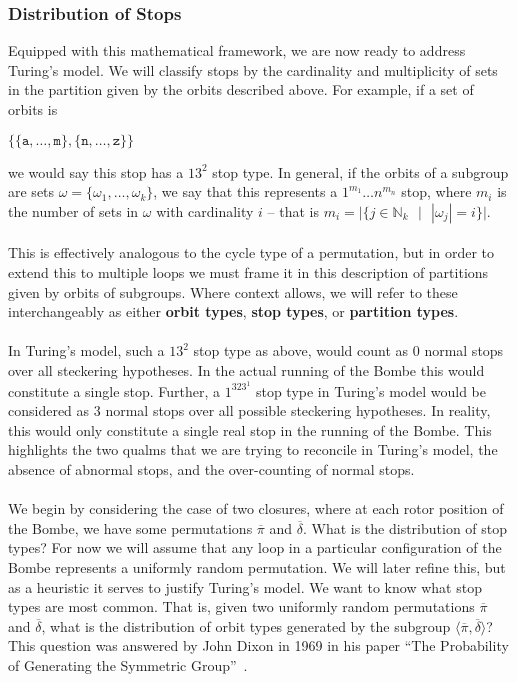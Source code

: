 \subsubsection{Distribution of Stops}
Equipped with this mathematical framework, we are now ready to address
Turing's model. We will classify stops by the cardinality and
multiplicity of sets in the partition given by the orbits described
above. For example, if a set of orbits is
\begin{center}
  $\{\{\texttt{a}, \dots, \texttt{m}\}, \{\texttt{n}, \dots, \texttt{z}\}\}$
\end{center}
we would say this stop has a $13^2$ stop type. In general, if the
orbits of a subgroup are sets $\omega = \{\omega_1,\dots,\omega_k\}$,
we say that this represents a $1^{m_1}\dots n^{m_n}$ stop, where
${m_i}$ is the number of sets in $\omega$ with cardinality $i$ --
that is $m_i =|\{j\in\mathbb{N}_k\text{ }|\text{ }|\omega_j| = i\}|$.
\\\\This is effectively
analogous to the cycle type of a permutation, but in order to extend
this to multiple loops we must frame it in this description of
partitions given by orbits of subgroups. Where context allows, we
will refer to these interchangeably as  either {\bf{orbit types}},
{\bf{stop types}}, or {\bf{partition types}}.
\\\\In Turing's model, such a $13^2$ stop type as above, would count as
$0$ normal stops over all steckering hypotheses. In the actual
running of the Bombe this would constitute a single stop. Further, a
$1^323^1$ stop type in Turing's model would be considered as $3$ normal
stops over all possible steckering hypotheses. In reality, this would
only constitute a single real stop in the running of the Bombe. This
highlights the two qualms that we are trying to reconcile in Turing's
model, the absence of abnormal stops, and the over-counting of normal stops.
\\\\We begin by considering the case of two closures, where at each
rotor position of the Bombe, we have some permutations $\overline\pi$
and $\overline\delta$. What is the distribution of stop types? For
now we will assume that any loop in a particular configuration of the
Bombe represents a uniformly random permutation. We will later refine this, but
as a heuristic it serves to justify Turing's model. We want to know
what stop types are most common. That is, given two uniformly random
permutations $\overline\pi$ and $\overline\delta$, what is the
distribution of orbit types generated by the subgroup
$\langle\overline\pi, \overline\delta\rangle$? This question was
answered by John Dixon in 1969 in his paper ``The Probability of
Generating the Symmetric Group''~\cite{Dixon1969}.

